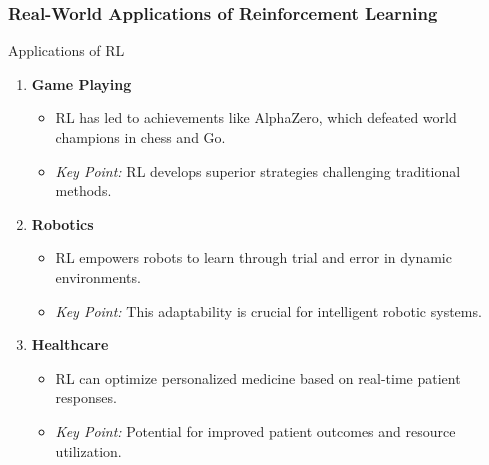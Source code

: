 \documentclass[aspectratio=169]{beamer}
\begin{document}
\begin{frame}[fragile]
    \frametitle{Real-World Applications of Reinforcement Learning}
    \begin{block}{Applications of RL}
        \begin{enumerate}
            \item \textbf{Game Playing}
                \begin{itemize}
                    \item RL has led to achievements like AlphaZero, which defeated world champions in chess and Go.
                    \item \textit{Key Point:} RL develops superior strategies challenging traditional methods.
                \end{itemize}

            \item \textbf{Robotics}
                \begin{itemize}
                    \item RL empowers robots to learn through trial and error in dynamic environments.
                    \item \textit{Key Point:} This adaptability is crucial for intelligent robotic systems.
                \end{itemize}

            \item \textbf{Healthcare}
                \begin{itemize}
                    \item RL can optimize personalized medicine based on real-time patient responses.
                    \item \textit{Key Point:} Potential for improved patient outcomes and resource utilization.
                \end{itemize}
        \end{enumerate}
    \end{block}
\end{frame}
\end{document}
